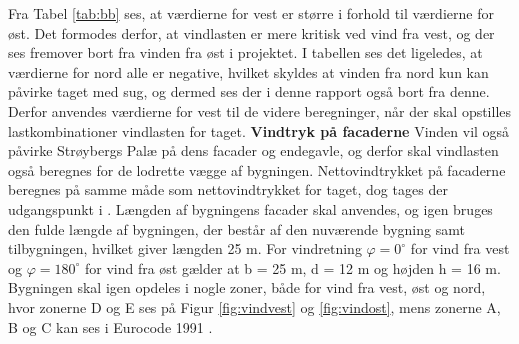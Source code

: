 Fra Tabel \ref{tab:bb} ses, at værdierne for vest er større i forhold til værdierne for øst. Det formodes derfor, at vindlasten er mere kritisk ved vind fra vest, og der ses fremover bort fra vinden fra øst i projektet. I tabellen ses det ligeledes, at værdierne for nord alle er negative, hvilket skyldes at vinden fra nord kun kan påvirke taget med sug, og dermed ses der i denne rapport også bort fra denne. 
\newline \indent{     }  Derfor anvendes værdierne for vest til de videre beregninger, når der skal opstilles lastkombinationer vindlasten for taget.
\newline
\newline
\textbf{Vindtryk på facaderne}
\newline
Vinden vil også påvirke Strøybergs Palæ på dens facader og endegavle, og derfor skal vindlasten også beregnes for de lodrette vægge af bygningen.
\newline \indent{     }  Nettovindtrykket på facaderne beregnes på samme måde som nettovindtrykket for taget, dog tages der udgangspunkt i \citep[ tabel 7.1]{EU91}. Længden af bygningens facader skal anvendes, og igen bruges den fulde længde af bygningen, der består af den nuværende bygning samt tilbygningen, hvilket giver længden 25 m. 
\newline
\newline
For vindretning $\varphi = 0^{\circ}$ for vind fra vest og $\varphi = 180^{\circ}$ for vind fra øst gælder at b = 25 m, d = 12 m og højden h = 16 m. Bygningen skal igen opdeles i nogle zoner, både for vind fra vest, øst og nord, hvor zonerne D og E ses på Figur \ref{fig:vindvest} og \ref{fig:vindost}, mens zonerne A, B og C kan ses i Eurocode 1991 \citep [kapitel 7.2.2 figur 7.5]{EU91}.

